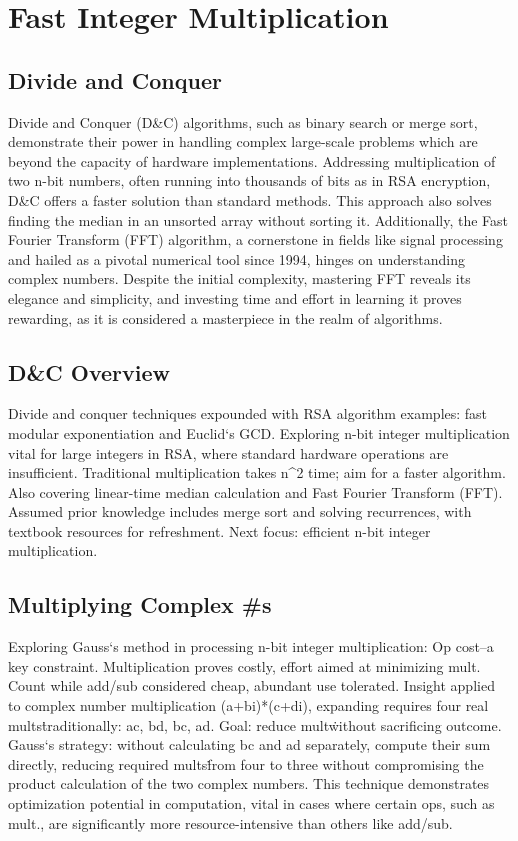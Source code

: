 \section*{Fast Integer Multiplication}

\subsection*{Divide and Conquer}
Divide and Conquer (D\&C) algorithms, such as binary search or merge sort, demonstrate their power in handling complex large-scale problems which are beyond the capacity of hardware implementations.
Addressing multiplication of two n-bit numbers, often running into thousands of bits as in RSA encryption, D\&C offers a faster solution than standard methods.
This approach also solves finding the median in an unsorted array without sorting it.
Additionally, the Fast Fourier Transform (FFT) algorithm, a cornerstone in fields like signal processing and hailed as a pivotal numerical tool since 1994, hinges on understanding complex numbers.
Despite the initial complexity, mastering FFT reveals its elegance and simplicity, and investing time and effort in learning it proves rewarding, as it is considered a masterpiece in the realm of algorithms.

\subsection*{D\&C  Overview}
Divide and conquer techniques expounded with RSA algorithm examples: fast modular exponentiation and Euclid`s GCD\@.
Exploring n-bit integer multiplication vital for large integers in RSA, where standard hardware operations are insufficient.
Traditional multiplication takes n\textasciicircum{}2 time; aim for a faster algorithm.
Also covering linear-time median calculation and Fast Fourier Transform (FFT).
Assumed prior knowledge includes merge sort and solving recurrences, with textbook resources for refreshment.
Next focus: efficient n-bit integer multiplication.

\subsection*{Multiplying Complex \#s}
Exploring Gauss`s method in processing n-bit integer multiplication: Op cost--a key constraint.
Multiplication proves costly, effort aimed at minimizing mult.
Count while add/sub considered cheap, abundant use tolerated.
Insight applied to complex number multiplication (a+bi)*(c+di), expanding requires four real mults\. traditionally: ac, bd, bc, ad.
Goal: reduce mult\. without sacrificing outcome.
Gauss`s strategy: without calculating bc and ad separately, compute their sum directly, reducing required mults\. from four to three without compromising the product calculation of the two complex numbers.
This technique demonstrates optimization potential in computation, vital in cases where certain ops, such as mult., are significantly more resource-intensive than others like add/sub.

